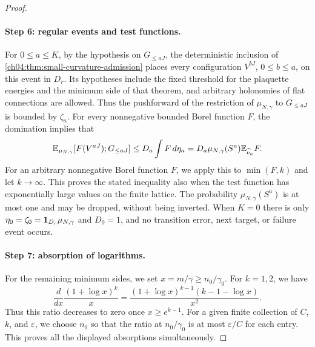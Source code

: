 \begin{proof}
\paragraph{Step 6: regular events and test functions.}
For $0\le a\le K$, by the hypothesis on $G_{\le aJ}$, the deterministic inclusion of \cref{ch04:thm:small-curvature-admission} places every configuration $V^{bJ}$, $0\le b\le a$, on this event in $D_r$. Its hypotheses include the fixed threshold for the plaquette energies and the minimum side of that theorem, and arbitrary holonomies of flat connections are allowed. Thus the pushforward of the restriction of $\mu_{N,\gamma}$ to $G_{\le aJ}$ is bounded by $\zeta_a$. For every nonnegative bounded Borel function $F$, the domination implies that
\[
 \mathbb E_{\mu_{N,\gamma}}[F(V^{aJ});G_{\le aJ}]\le D_a\int F\,d\eta_a=D_a\mu_{N,\gamma}(S^a)\mathbb E_{\widehat\nu_a}F.
\]
For an arbitrary nonnegative Borel function $F$, we apply this to $\min(F,k)$ and let $k\to\infty$. This proves the stated inequality also when the test function has exponentially large values on the finite lattice. The probability $\mu_{N,\gamma}(S^a)$ is at most one and may be dropped, without being inverted. When $K=0$ there is only $\eta_0=\zeta_0=\mathbf 1_{D_r}\mu_{N,\gamma}$ and $D_0=1$, and no transition error, next target, or failure event occurs.

\paragraph{Step 7: absorption of logarithms.}
For the remaining minimum sides, we set $x=m/\gamma\ge n_0/\gamma_0$. For $k=1,2$, we have
\[
 \frac{d}{dx}\frac{(1+\log x)^k}{x}=\frac{(1+\log x)^{k-1}(k-1-\log x)}{x^2}.
\]
Thus this ratio decreases to zero once $x\ge e^{k-1}$. For a given finite collection of $C$, $k$, and $\varepsilon$, we choose $n_0$ so that the ratio at $n_0/\gamma_0$ is at most $\varepsilon/C$ for each entry. This proves all the displayed absorptions simultaneously.


\end{proof}
